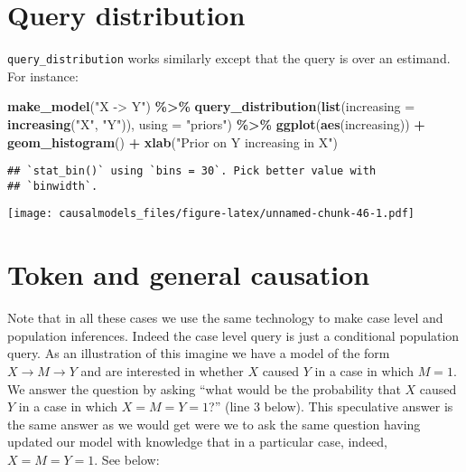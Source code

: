 \documentclass[
  12pt,
]{book}
\newenvironment{Shaded}{\begin{snugshade}}{\end{snugshade}}
\newcommand{\AttributeTok}[1]{\textcolor[rgb]{0.13,0.29,0.53}{#1}}
\newcommand{\FunctionTok}[1]{\textcolor[rgb]{0.13,0.29,0.53}{\textbf{#1}}}
\newcommand{\NormalTok}[1]{#1}
\newcommand{\SpecialCharTok}[1]{\textcolor[rgb]{0.81,0.36,0.00}{\textbf{#1}}}
\newcommand{\StringTok}[1]{\textcolor[rgb]{0.31,0.60,0.02}{#1}}
\begin{document}
\hypertarget{query-distribution}{%
\section{Query distribution}\label{query-distribution}}

\texttt{query\_distribution} works similarly except that the query is over an estimand. For instance:

\begin{Shaded}
\begin{Highlighting}[]
\FunctionTok{make\_model}\NormalTok{(}\StringTok{"X {-}\textgreater{} Y"}\NormalTok{) }\SpecialCharTok{\%\textgreater{}\%} 
  \FunctionTok{query\_distribution}\NormalTok{(}\FunctionTok{list}\NormalTok{(}\AttributeTok{increasing =} \FunctionTok{increasing}\NormalTok{(}\StringTok{"X"}\NormalTok{, }\StringTok{"Y"}\NormalTok{)), }
                     \AttributeTok{using =} \StringTok{"priors"}\NormalTok{) }\SpecialCharTok{\%\textgreater{}\%}
  \FunctionTok{ggplot}\NormalTok{(}\FunctionTok{aes}\NormalTok{(increasing)) }\SpecialCharTok{+} \FunctionTok{geom\_histogram}\NormalTok{()  }\SpecialCharTok{+} 
  \FunctionTok{xlab}\NormalTok{(}\StringTok{"Prior on Y increasing in X"}\NormalTok{)  }
\end{Highlighting}
\end{Shaded}

\begin{verbatim}
## `stat_bin()` using `bins = 30`. Pick better value with
## `binwidth`.
\end{verbatim}

\texttt{[image: causalmodels\_files/figure-latex/unnamed-chunk-46-1.pdf]}

\hypertarget{token-and-general-causation}{%
\section{Token and general causation}\label{token-and-general-causation}}

Note that in all these cases we use the same technology to make case level and population inferences. Indeed the case level query is just a conditional population query. As an illustration of this imagine we have a model of the form \(X \rightarrow M \rightarrow Y\) and are interested in whether \(X\) caused \(Y\) in a case in which \(M=1\). We answer the question by asking ``what would be the probability that \(X\) caused \(Y\) in a case in which \(X=M=Y=1\)?'' (line 3 below). This speculative answer is the same answer as we would get were we to ask the same question having updated our model with knowledge that in a particular case, indeed, \(X=M=Y=1\). See below:
\end{document}
